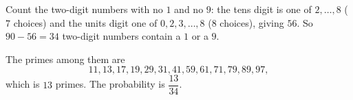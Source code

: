 Count the two-digit numbers with no $1$ and no $9$: the tens digit is one of $2,\dots,8$ ($7$ choices) and the units digit one of $0,2,3,\dots,8$ ($8$ choices), giving $56$. So $90-56=34$ two-digit numbers contain a $1$ or a $9$.

The primes among them are
\[11,13,17,19,29,31,41,59,61,71,79,89,97,\]
which is $13$ primes. The probability is $\boxed{\dfrac{13}{34}}$.
